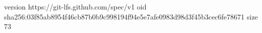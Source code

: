 version https://git-lfs.github.com/spec/v1
oid sha256:03f85ab8954f46cb87b0b9c998194f94e5e7afe0983d98d3f45b3cec6fe78671
size 73
